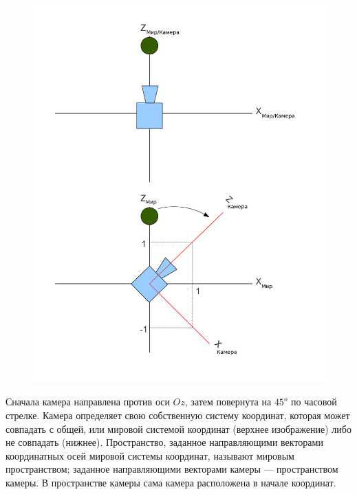   \begin{figure}\begin{center}\includegraphics[scale=0.4]{camera.png} \end{center}\end{figure}
  
  
   Сначала камера направлена против оси \begin{math}Oz\end{math}, затем повернута на \begin{math}45^o\end{math} по часовой стрелке. Камера определяет свою собственную систему координат, которая может совпадать с общей, или мировой системой координат (верхнее изображение) либо не совпадать (нижнее). Пространство, заданное направляющими векторами координатных осей мировой системы координат, называют мировым пространством; заданное направляющими векторами  камеры ---  пространством камеры. В пространстве камеры сама камера расположена в начале координат.
    
